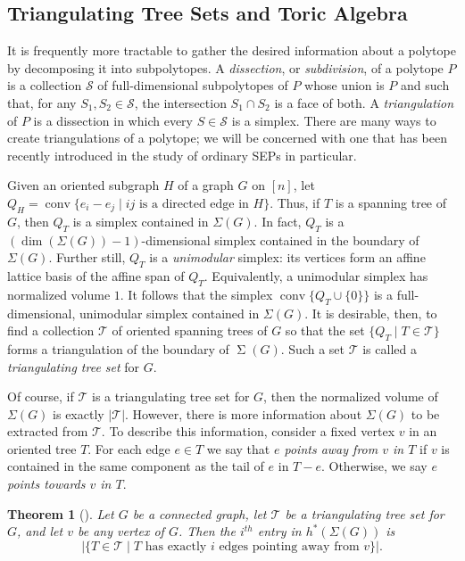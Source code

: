 \documentclass{amsart}
\numberwithin{equation}{section}
\theoremstyle{plain}
\newtheorem{thm}{Theorem}[section]
\theoremstyle{definition}
\DeclareMathOperator{\conv}{conv}
\newcommand{\calS}{\mathcal{S}}
\newcommand{\calT}{\mathcal{T}}
\DeclareMathOperator{\SEP}{\Sigma}
\begin{document}
\subsection{Triangulating Tree Sets and Toric Algebra}

It is frequently more tractable to gather the desired information about a polytope by decomposing it into subpolytopes.
A \emph{dissection}, or \emph{subdivision}, of a polytope $P$ is a collection $\calS$ of full-dimensional subpolytopes of $P$ whose union is $P$ and such that, for any $S_1, S_2 \in \calS$, the intersection $S_1 \cap S_2$ is a face of both. 
A \emph{triangulation} of $P$ is a dissection in which every $S \in \calS$ is a simplex.
There are many ways to create triangulations of a polytope; we will be concerned with one that has been recently introduced in the study of ordinary SEPs in particular.

Given an oriented subgraph $H$ of a graph $G$ on $[n]$, let $Q_H = \conv\{e_i - e_j \mid ij \mbox{ is a directed edge in } H\}$.
Thus, if $T$ is a spanning tree of $G$, then $Q_T$ is a simplex contained in $\Sigma(G)$.
In fact, $Q_T$ is a $(\dim(\Sigma(G))-1)$-dimensional simplex contained in the boundary of $\Sigma(G)$.
Further still, $Q_T$ is a \emph{unimodular} simplex: its vertices form an affine lattice basis of the affine span of $Q_T$.
Equivalently, a unimodular simplex has normalized volume $1$.
It follows that the simplex $\conv\{Q_T \cup \{0\}\}$ is a full-dimensional, unimodular simplex contained in $\Sigma(G)$.
It is desirable, then, to find a collection $\calT$ of oriented spanning trees of $G$ so that the set $\{Q_T \mid T \in \calT\}$ forms a triangulation of the boundary of $\SEP(G)$.
Such a set $\calT$ is called a \emph{triangulating tree set} for $G$.

Of course, if $\calT$ is a triangulating tree set for $G$, then the normalized volume of $\Sigma(G)$ is exactly $|\calT|$.
However, there is more information about $\Sigma(G)$ to be extracted from $\calT$.
To describe this information, consider a fixed vertex $v$ in an oriented tree $T$. 
For each edge $e \in T$ we say that \emph{$e$ points away from $v$ in $T$} if $v$ is contained in the same component as the tail of $e$ in $T - e$.
Otherwise, we say \emph{$e$ points towards $v$ in $T$}.

\begin{thm}[{\cite[Theorem 1.2]{KalmanTothmeresz}}]\label{thm: h-star contributions}
    Let $G$ be a connected graph, let $\calT$ be a triangulating tree set for $G$, and let $v$ be any vertex of $G$.
    Then the $i^{th}$ entry in $h^*(\Sigma(G))$ is
    \[
        |\{T \in \calT \mid T \text{ has exactly } i \text{ edges pointing away from } v\}|.
    \]
\end{thm}
\end{document}
